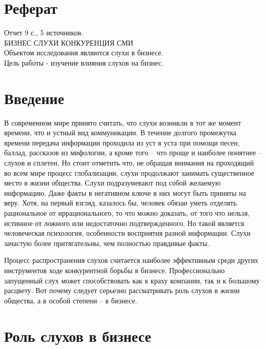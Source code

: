\documentclass[a4paper,14pt,russian]{report}
\begin{document}


\newpage
{}
\setcounter{page}{2}

\section*{Реферат}

\noindent Отчет 9 с., 5 источников. \\
БИЗНЕС СЛУХИ КОНКУРЕНЦИЯ СМИ \\
Объектом исследования являются слухи в бизнесе. \\
Цель работы - изучение влияния слухов на бизнес. \\

\tableofcontents

\section{Введение}

В современном мире принято считать, что слухи возникли в тот же момент времени, что и устный вид коммуникации. В течение долгого промежутка времени передача информации проходила из уст в уста при помощи песен, баллад, рассказов из мифологии, а кроме того – что проще и наиболее понятнее – слухов и сплетен. Но стоит отметить что, не обращая внимания на проходящий во всем мире процесс глобализации, слухи продолжают занимать существенное место в жизни общества. Слухи подразумевают под собой желаемую информацию. Даже факты в негативном ключе в них могут быть приняты на веру. Хотя, на первый взгляд, казалось бы, человек обязан уметь отделять рациональное от иррационального, то что можно доказать, от того что нельзя, истинное от ложного или недостаточно подтвержденного. Но такой является человеческая психология, особенности восприятия разной информации. Слухи зачастую более притягательны, чем полностью правдивые факты.

Процесс распространения слухов считается наиболее эффективным среди других инструментов ходе конкурентной борьбы в бизнесе. Профессионально запущенный слух может способствовать как к краху компании, так и к большому расцвету. Вот почему следует серьезно рассматривать роль слухов в жизни общества, а в особой степени – в бизнесе.

\section{Роль слухов в бизнесе}
\end{document}
